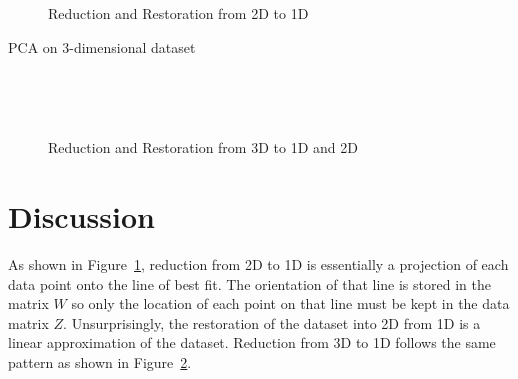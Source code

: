 \documentclass{article}
\begin{document}
		\begin{figure}[!htbp]
			\centering
			\caption{Reduction and Restoration from 2D to 1D}
			\label{fig:2d}
			\subfloat[Reduced to 1D]{\resizebox{0.48\linewidth}{!}{}}
		\end{figure}

		\begin{table}[!htbp]
			\centering
			\caption{PCA on 3-dimensional dataset\vspace{-3ex}}\vspace{2ex}
			\label{tab:3d}
			\\
		\end{table}

		\begin{figure}[!htbp]
			\centering
			\caption{Reduction and Restoration from 3D to 1D and 2D}
			\label{fig:3d}
			\subfloat[Reduced to 1D]{\resizebox{0.48\linewidth}{!}{}}
			 \\
		\end{figure}

	\section{Discussion}
		As shown in Figure~\ref{fig:2d}, reduction from 2D to 1D is essentially a projection of each data point onto the line of best fit. The orientation of that line is stored in the matrix $W$ so only the location of each point on that line must be kept in the data matrix $Z$. Unsurprisingly, the restoration of the dataset into 2D from 1D is a linear approximation of the dataset. Reduction from 3D to 1D follows the same pattern as shown in Figure~\ref{fig:3d}.
\end{document}
